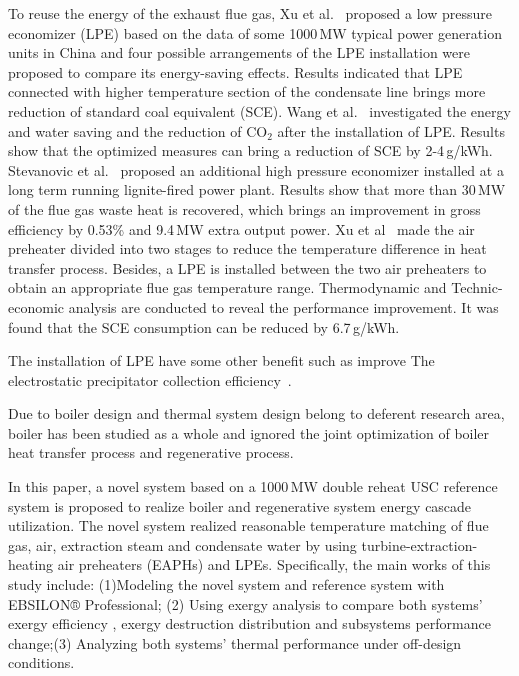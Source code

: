 \documentclass[preprint,12pt]{elsarticle}
\begin{document}
To reuse the energy of the exhaust flue gas, Xu et al.~\cite{Xu2013Techno} proposed a low pressure economizer (LPE) based on the data of some 1000\,MW typical power generation units in China and four possible arrangements of the LPE installation were proposed to compare its energy-saving effects.
Results indicated that LPE connected with higher temperature section of the condensate line brings more reduction of standard coal equivalent (SCE).
Wang et al.~\cite{Wang2012Application} investigated the energy and water saving and the reduction of CO$_2$ after the installation of LPE.
Results show that the optimized measures can bring a reduction of SCE by 2-4\,g/kWh.
Stevanovic et al.~\cite{Stevanovic2014Efficiency} proposed an additional high pressure economizer installed at a long term running lignite-fired power plant.
Results show that more than 30\,MW of the flue gas waste heat is recovered, which brings an improvement in gross efficiency by 0.53\% and 9.4\,MW extra output power.
Xu et al~\cite{Xu2013A} made the air preheater divided into two stages to reduce the temperature difference in heat transfer process.
Besides, a LPE is installed between the two air preheaters to obtain an appropriate flue gas temperature range.
Thermodynamic and Technic-economic analysis are conducted to reveal the performance improvement.
It was found that the SCE consumption can be reduced by 6.7\,g/kWh. 

The installation of LPE have some other benefit such as improve The electrostatic precipitator collection efficiency~\cite{Li2016Low}.

Due to  boiler design and thermal system design belong to deferent research area, boiler has been studied as a whole and ignored the joint optimization of boiler heat transfer process and regenerative process.

In this paper, a novel system based on a 1000\,MW double reheat USC reference system  is proposed to realize boiler and regenerative system energy cascade utilization. 
The novel system realized reasonable temperature matching of flue gas, air, extraction steam and condensate water by using turbine-extraction-heating air preheaters (EAPHs) and LPEs.
Specifically, the main works of this study include: (1)Modeling the novel system and reference system with EBSILON® Professional; (2) Using exergy analysis to compare both systems' exergy efficiency , exergy destruction distribution and subsystems performance change;(3) Analyzing both systems' thermal performance under off-design conditions.
\end{document}
